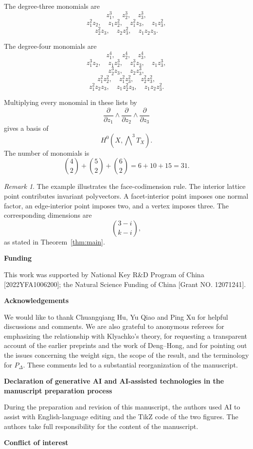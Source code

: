 \documentclass[colorlinks,11pt,reqno]{amsart}
\theoremstyle{definition}
\theoremstyle{remark}
\newtheorem{remark}[theorem]{Remark}
\numberwithin{equation}{section}
\numberwithin{equation}{section}
\begin{document}
The degree-three monomials are
\[
z_1^3,\quad z_2^3,\quad z_3^3,
\]
\[
z_1^2z_2,\quad z_1z_2^2,\quad z_1^2z_3,\quad z_1z_3^2,
\]
\[
z_2^2z_3,\quad z_2z_3^2,\quad z_1z_2z_3.
\]

The degree-four monomials are
\[
z_1^4,\quad z_2^4,\quad z_3^4,
\]
\[
z_1^3z_2,\quad z_1z_2^3,\quad
z_1^3z_3,\quad z_1z_3^3,
\]
\[
z_2^3z_3,\quad z_2z_3^3,
\]
\[
z_1^2z_2^2,\quad
z_1^2z_3^2,\quad
z_2^2z_3^2,
\]
\[
z_1^2z_2z_3,\quad
z_1z_2^2z_3,\quad
z_1z_2z_3^2.
\]

Multiplying every monomial in these lists by
\[
\frac{\partial}{\partial z_1}
\wedge
\frac{\partial}{\partial z_2}
\wedge
\frac{\partial}{\partial z_3}
\]
gives a basis of
\[
H^0\!\left(X,\bigwedge\nolimits^3T_X\right).
\]
The number of monomials is
\[
\binom{4}{2}+\binom{5}{2}+\binom{6}{2}
=
6+10+15
=
31.
\]

\begin{remark}
The example illustrates the face-codimension rule. The interior lattice point contributes invariant polyvectors. A facet-interior point imposes one normal factor, an edge-interior point imposes two,
and a vertex imposes three. The corresponding dimensions are
\[
\binom{3-i}{k-i},
\]
as stated in Theorem~\ref{thm:main}.
\end{remark}


{\bf Funding}

This work was supported by National Key R\&D Program of China [2022YFA1006200]; the Natural Science Funding of China [Grant NO. 12071241].


{\bf Acknowledgements}

We would like to thank Chuangqiang Hu, Yu Qiao and Ping Xu for helpful discussions and comments.
We are also grateful to anonymous referees for emphasizing the relationship with Klyachko's theory, for requesting a transparent account of the earlier preprints and the work of Deng--Hong, and for
pointing out the issues concerning the weight sign, the scope of the result, and the terminology for \(P_\Delta\). These comments led to a substantial reorganization of the manuscript.


{\bf Declaration of generative AI and AI-assisted technologies in the manuscript preparation process}

During the preparation and revision of this manuscript, the authors used AI to assist with English-language editing and the TikZ code of the two figures.
The authors take full responsibility for the content of the manuscript.

{\bf Conflict of interest}
\end{document}
